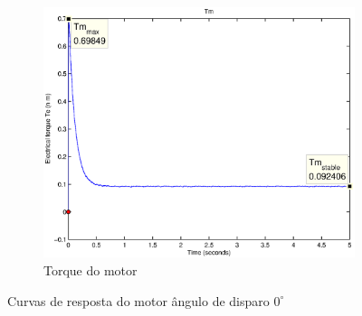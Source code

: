 \documentclass{article}
\begin{document}
\begin{figure}[H]
\begin{subfigure}[b]{0.49\linewidth}
		\includegraphics[width=\linewidth]{matlab/tm6}
		\caption{Torque do motor}
	\end{subfigure}
	\caption{Curvas de resposta do motor ângulo de disparo $0^\circ$}
	\label{fig:res6}
\end{figure}
\end{document}
